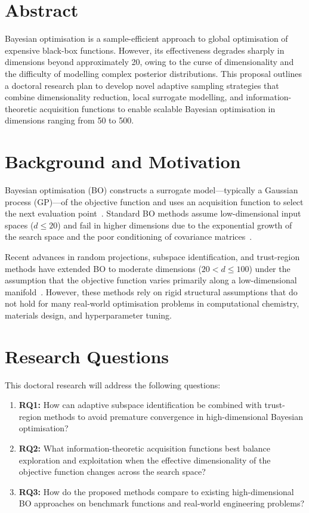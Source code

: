 \documentclass[
    language=english,
    doctype=thesis-proposal,
    institution=none,
]{../../omnilatex}
\begin{document}
\maketitle

\section*{Abstract}
Bayesian optimisation is a sample-efficient approach to global optimisation of
expensive black-box functions.  However, its effectiveness degrades sharply in
dimensions beyond approximately 20, owing to the curse of dimensionality and
the difficulty of modelling complex posterior distributions.  This proposal
outlines a doctoral research plan to develop novel adaptive sampling strategies
that combine dimensionality reduction, local surrogate modelling, and
information-theoretic acquisition functions to enable scalable Bayesian
optimisation in dimensions ranging from 50 to 500.

\section{Background and Motivation}
Bayesian optimisation (BO) constructs a surrogate model---typically a Gaussian
process (GP)---of the objective function and uses an acquisition function to
select the next evaluation point~\cite{bibid}.  Standard BO methods assume
low-dimensional input spaces ($d \leq 20$) and fail in higher dimensions due to
the exponential growth of the search space and the poor conditioning of
covariance matrices~\cite{einstein1905}.

Recent advances in random projections, subspace identification, and trust-region
methods have extended BO to moderate dimensions ($20 < d \leq 100$) under the
assumption that the objective function varies primarily along a low-dimensional
manifold~\cite{goossensLaTeXCompanion1993}.  However, these methods rely on
rigid structural assumptions that do not hold for many real-world optimisation
problems in computational chemistry, materials design, and hyperparameter
tuning.

\section{Research Questions}
This doctoral research will address the following questions:

\begin{enumerate}
    \item \textbf{RQ1:} How can adaptive subspace identification be combined
    with trust-region methods to avoid premature convergence in high-dimensional
    Bayesian optimisation?
    \item \textbf{RQ2:} What information-theoretic acquisition functions best
    balance exploration and exploitation when the effective dimensionality of the
    objective function changes across the search space?
    \item \textbf{RQ3:} How do the proposed methods compare to existing
    high-dimensional BO approaches on benchmark functions and real-world
    engineering problems?
\end{enumerate}
\end{document}

